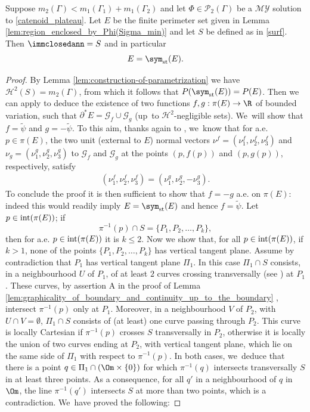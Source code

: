 \begin{lemma}\label{lemma_step5}
Suppose $m_2(\Gamma)<m_1(\Gamma_1)+m_1(\Gamma_2)$ and let $\Phi\in\mathcal{P}_2(\Gamma)$ be a $\mathcal{MY}$ solution to \eqref{catenoid_plateau}. Let $E$ be the finite perimeter set given in Lemma \ref{lem:region_enclosed_by_Phi(Sigma_min)} and let $S$ be defined as in \eqref{surf}. Then
$\immclosedann=S$
and in particular
\[
E=\sym_\mathrm{st}(E).
\]
\end{lemma}

\begin{proof} By Lemma \ref{lem:construction-of-parametrization} we have $\mathcal H^2(S)=m_2(\Gamma)$, from which it follows that
$P(\sym_\mathrm{st}(E))= P(E)$. Then we can apply \cite[Th.\,1.1]{CCF}
to deduce the existence of two functions
$f,g:\pi(E)\to \R$ of bounded variation, such that $\partial^* E=\mathcal G_f\cup\mathcal G_{g}$ (up~to $\mathcal H^2$-negligible sets). We~will show that $f=\widetilde\psi$ and $g=-\widetilde\psi$. To this aim,
thanks again to \cite[Th.\,1.1]{CCF}, we~know that for a.e. $p\in \pi(E)$, the two unit (external to $E$) normal
vectors $\nu^f=(\nu^f_1,\nu^f_2,\nu^f_3)$ and $\nu_g=(\nu^g_1,\nu^g_2,\nu^g_3)$ to $\mathcal G_f$ and $\mathcal G_g$ at the points $(p,f(p))$ and $(p,g(p))$, respectively, satisfy\enlargethispage{2pt}
\begin{align}\label{normals}
(\nu^f_1,\nu^f_2,\nu^f_3)=(\nu^g_1,\nu^g_2,-\nu^g_3).
\end{align}
To conclude the proof it is then sufficient to show that $f=-g$ a.e. on $\pi(E)$: indeed this would readily imply $E=\sym_\mathrm{st}(E)$ and hence $f=\widetilde\psi$.
Let $p\in \textup{int}(\pi(E))$; if
\begin{equation}
\pi^{-1}(p)\cap S=\{P_1,P_2,\dots,P_k\},
\end{equation}
then for a.e. $p\in \textup{int}(\pi(E))$ it is $k\leq2$.
Now we show that, for all $p\in \textup{int}(\pi(E))$, if $k>1$, none of the points $\{P_1,P_2,\dots,P_k\}$ has vertical tangent plane.
Assume by contradiction that $P_1$ has vertical tangent plane $\Pi_1$. In this case $\Pi_1\cap S$ consists, in a neighbourhood $U$ of $P_1$, of at least $2$ curves crossing {transversally} (see \cite[\S 373]{Nitsche:89}) at $P_1$. These curves, by assertion A in the proof of Lemma \ref{lem:graphicality_of_boundary_and_continuity_up_to_the_boundary} , intersect $\pi^{-1}(p)$ only at $P_1$. Moreover, in a neighbourhood $V$ of $P_2$, with $U\cap V=\emptyset$, $\Pi_1\cap S$ consists of (at least) one
curve passing through $P_2$. This curve is locally Cartesian if $\pi^{-1}(p)$ crosses $S$ transversally in $P_2$, otherwise it is
locally the union of two curves ending at $P_2$, with vertical tangent plane, which lie on the same side of $\Pi_1$ with respect to $\pi^{-1}(p)$. In both cases, we~deduce that there is a point $q\in \Pi_1\cap (\Om\times\{0\})$ for which $\pi^{-1}(q)$ intersects transversally $S$ in at least three points. As a consequence, for all $q'$ in a neighbourhood of $q$ in
$\Om$, the line $\pi^{-1}(q')$ intersects $S$ at more than two points, which is a contradiction. We~have proved the following:


\end{proof}
